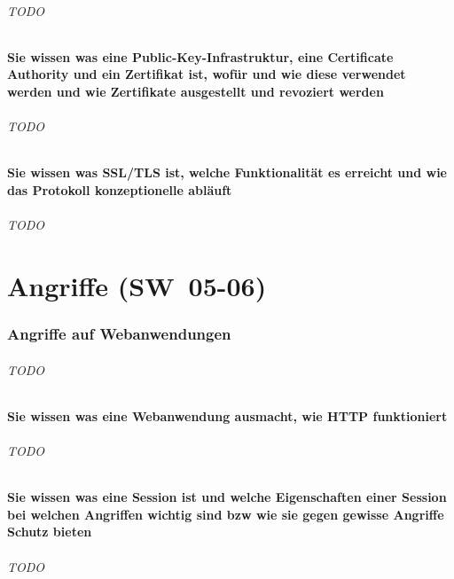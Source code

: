 \documentclass[10pt,a4paper]{article}
\begin{document}
\paragraph*{TODO}
\subsection*{Sie wissen was eine Public-Key-Infrastruktur, eine Certificate Authority und ein Zertifikat ist, wofür und wie diese verwendet werden und wie Zertifikate ausgestellt und revoziert werden}
\paragraph*{TODO}
\subsection*{Sie wissen was SSL/TLS ist, welche Funktionalität es erreicht und wie das Protokoll konzeptionelle abläuft}
\paragraph*{TODO}



\part{Angriffe (SW~05-06)}
\section{Angriffe auf Webanwendungen}
\paragraph*{TODO}
\subsection*{Sie wissen was eine Webanwendung ausmacht, wie HTTP funktioniert}
\paragraph*{TODO}
\subsection*{Sie wissen was eine Session ist und welche Eigenschaften einer Session bei welchen Angriffen wichtig sind bzw wie sie gegen gewisse Angriffe Schutz bieten}
\paragraph*{TODO}
\end{document}
